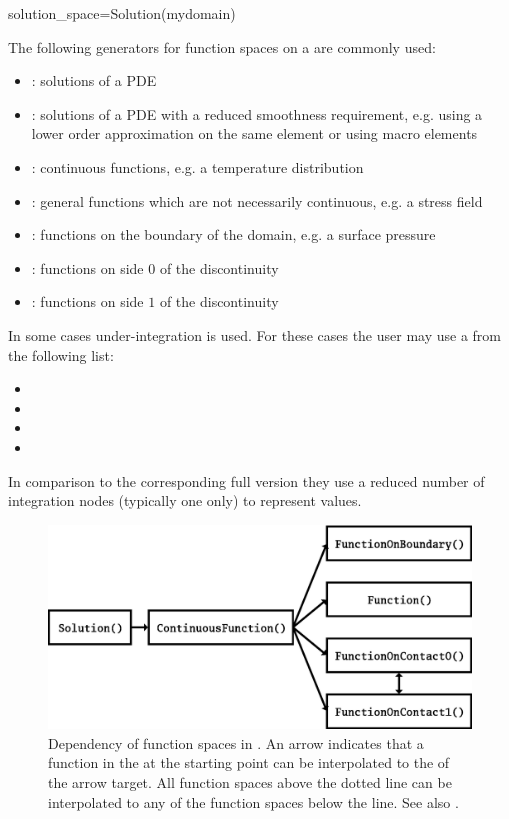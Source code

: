 \begin{python}
  solution_space=Solution(mydomain)
\end{python}
The following generators for function spaces on a \Domain {} are commonly used:
\begin{itemize}
\item {}: solutions of a PDE
\item {}: solutions of a PDE with a reduced
    smoothness requirement, e.g. using a lower order approximation on the same
    element or using macro elements
\item {}: continuous functions, e.g. a temperature distribution
\item {}: general functions which are not necessarily continuous, e.g. a stress field
\item {}: functions on the boundary of the domain, e.g. a surface pressure
\item {}: functions on side $0$ of the discontinuity
\item {}: functions on side $1$ of the discontinuity
\end{itemize}
In some cases under-integration is used. For these cases the user may use a
\FunctionSpace from the following list:
\begin{itemize}
\item {}
\item {}
\item {}
\item {}
\end{itemize}
In comparison to the corresponding full version they use a reduced number of
integration nodes (typically one only) to represent values.

\begin{figure}
\centering
\includegraphics{EscriptDiagram1}
\caption{\label{ESCRIPT DEP}Dependency of function spaces in \finley.
An arrow indicates that a function in the \FunctionSpace at the starting point
can be interpolated to the \FunctionSpace of the arrow target.
All function spaces above the dotted line can be interpolated to any of
the function spaces below the line. See also .}
\end{figure}

